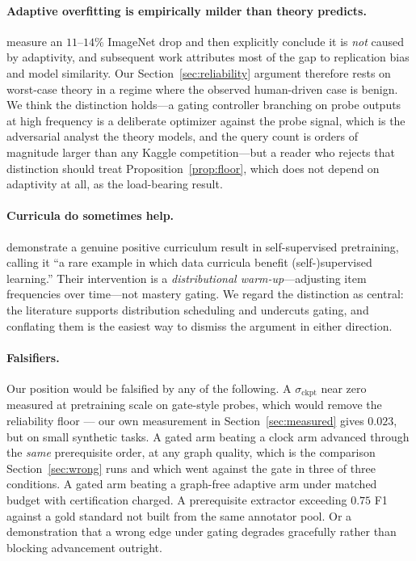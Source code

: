 \documentclass[11pt]{article}
\theoremstyle{plain}
\theoremstyle{definition}
\theoremstyle{remark}
\begin{document}
\paragraph{Adaptive overfitting is empirically milder than theory predicts.}
\citet{recht2019imagenet} measure an $11$--$14\%$ ImageNet drop and then
explicitly conclude it is \emph{not} caused by adaptivity, and subsequent work
attributes most of the gap to replication bias and model similarity. Our
Section~\ref{sec:reliability} argument therefore rests on worst-case theory in a
regime where the observed human-driven case is benign. We think the distinction
holds---a gating controller branching on probe outputs at high frequency is a
deliberate optimizer against the probe signal, which is the adversarial analyst
the theory models, and the query count is orders of magnitude larger than any
Kaggle competition---but a reader who rejects that distinction should treat
Proposition~\ref{prop:floor}, which does not depend on adaptivity at all, as the
load-bearing result.

\paragraph{Curricula do sometimes help.} \citet{zucchet2025} demonstrate a
genuine positive curriculum result in self-supervised pretraining, calling it ``a
rare example in which data curricula benefit (self-)supervised learning.'' Their
intervention is a \emph{distributional warm-up}---adjusting item frequencies over
time---not mastery gating. We regard the distinction as central: the literature
supports distribution scheduling and undercuts gating, and conflating them is the
easiest way to dismiss the argument in either direction.

\paragraph{Falsifiers.} Our position would be falsified by any of the following.
A $\sigma_{\text{ckpt}}$ near zero measured at pretraining scale on gate-style
probes, which would remove the reliability floor --- our own measurement in
Section~\ref{sec:measured} gives $0.023$, but on small synthetic tasks. A gated
arm beating a clock arm advanced through the \emph{same} prerequisite order, at
any graph quality, which is the comparison Section~\ref{sec:wrong} runs and which
went against the gate in three of three conditions. A gated arm beating a
graph-free adaptive arm under matched budget with certification charged. A
prerequisite extractor exceeding $0.75$ F1 against a gold standard not built from
the same annotator pool. Or a demonstration that a wrong edge under gating
degrades gracefully rather than blocking advancement outright.
\end{document}
